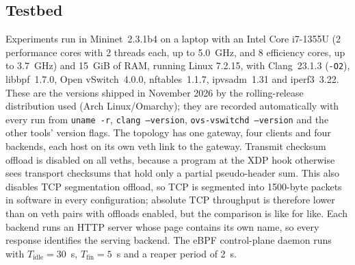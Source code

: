 \documentclass[conference]{IEEEtran}
\begin{document}
\subsection{Testbed}
Experiments run in Mininet~2.3.1b4 \cite{lantz2010mininet} on a laptop with an
Intel Core i7-1355U (2 performance cores with 2 threads each, up to 5.0~GHz,
and 8 efficiency cores, up to 3.7~GHz) and 15~GiB of RAM, running Linux
7.2.15, with Clang~23.1.3 (\texttt{-O2}), libbpf~1.7.0, Open vSwitch~4.0.0,
nftables~1.1.7, ipvsadm~1.31 and iperf3~3.22. These are the versions
shipped in November 2026 by the rolling-release distribution used (Arch
Linux/Omarchy); they are recorded automatically with every run from
\texttt{uname -r}, \texttt{clang --version}, \texttt{ovs-vswitchd --version}
and the other tools' version flags. The topology has one gateway, four clients and
four backends, each host on its own veth link to the gateway. Transmit
checksum offload is disabled on all veths, because a program at the XDP hook
otherwise sees transport checksums that hold only a partial pseudo-header
sum. This also disables TCP segmentation offload, so TCP is segmented into
1500-byte packets in software in every configuration; absolute TCP
throughput is therefore lower than on veth pairs with offloads enabled, but
the comparison is like for like. Each backend runs an HTTP server whose page
contains its own name, so every response identifies the serving backend. The
eBPF control-plane daemon runs with $T_{\mathrm{idle}}=30$~s, $T_{\mathrm{fin}}=5$~s and a
reaper period of 2~s.
\end{document}
